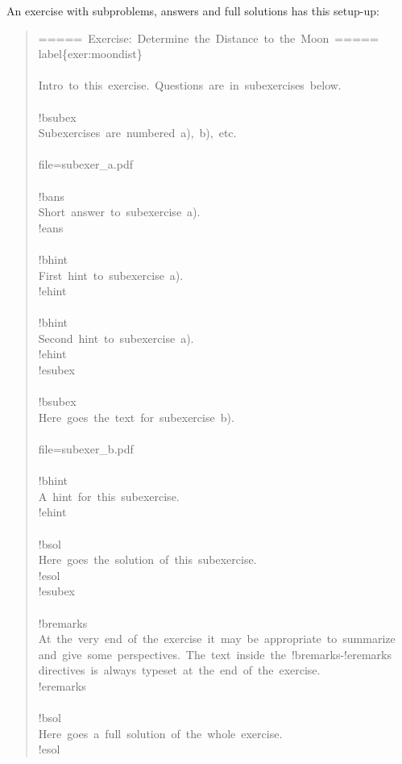 \documentclass[a4paper]{article}
\begin{document}
An exercise with subproblems, answers and full solutions has this
setup-up:
%
\begin{quote}{\ttfamily \raggedright \noindent
=====~Exercise:~Determine~the~Distance~to~the~Moon~=====\\
label\{exer:moondist\}\\
~\\
Intro~to~this~exercise.~Questions~are~in~subexercises~below.\\
~\\
!bsubex\\
Subexercises~are~numbered~a),~b),~etc.\\
~\\
file=subexer\_a.pdf\\
~\\
!bans\\
Short~answer~to~subexercise~a).\\
!eans\\
~\\
!bhint\\
First~hint~to~subexercise~a).\\
!ehint\\
~\\
!bhint\\
Second~hint~to~subexercise~a).\\
!ehint\\
!esubex\\
~\\
!bsubex\\
Here~goes~the~text~for~subexercise~b).\\
~\\
file=subexer\_b.pdf\\
~\\
!bhint\\
A~hint~for~this~subexercise.\\
!ehint\\
~\\
!bsol\\
Here~goes~the~solution~of~this~subexercise.\\
!esol\\
!esubex\\
~\\
!bremarks\\
At~the~very~end~of~the~exercise~it~may~be~appropriate~to~summarize\\
and~give~some~perspectives.~The~text~inside~the~!bremarks-!eremarks\\
directives~is~always~typeset~at~the~end~of~the~exercise.\\
!eremarks\\
~\\
!bsol\\
Here~goes~a~full~solution~of~the~whole~exercise.\\
!esol
}
\end{quote}
\end{document}
